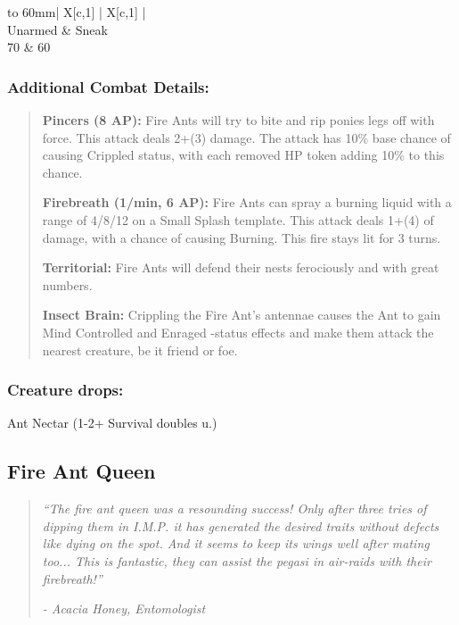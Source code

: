 \documentclass[11pt,a4paper,twocolumn]{book}
\begin{document}
	\bigskip
	{
		\begin{tabu} to 60mm{| X[c,1] | X[c,1] |}
			\hline
			 \\ \hline
			Unarmed & Sneak                                  \\
			70      & 60                                     \\ \hline
		\end{tabu}
		
	}
	
	\subsubsection*{Additional Combat Details:}
	\begin{verse}
		\textbf{Pincers (8 AP):} Fire Ants will try to bite and rip ponies legs off with force. This attack deals 2+(3) damage. The attack has 10\% base chance of causing Crippled status, with each removed HP token adding 10\% to this chance.
		
		\textbf{Firebreath (1/min, 6 AP):} Fire Ants can spray a burning liquid with a range of 4/8/12 on a Small Splash template. This attack deals 1+(4) of damage, with a chance of causing Burning. This fire stays lit for 3 turns.
		
		\textbf{Territorial:} Fire Ants will defend their nests ferociously and with great numbers.
		
		\textbf{Insect Brain:} Crippling the Fire Ant's antennae causes the Ant to gain Mind Controlled and Enraged -status effects and make them attack the nearest creature, be it friend or foe.
	\end{verse}
	
	\subsubsection*{Creature drops:}
	Ant Nectar (1-2+ Survival doubles u.)
	
	\vfill
	
	\subsection*{Fire Ant Queen}
	\begin{quote}
		\emph{``The fire ant queen was a resounding success! Only after three tries of dipping them in I.M.P. it has generated the desired traits without defects like dying on the spot. And it seems to keep its wings well after mating too... This is fantastic, they can assist the pegasi in air-raids with their firebreath!''}
		
		\emph{-	Acacia Honey, Entomologist}
	\end{quote}
	
\end{document}
